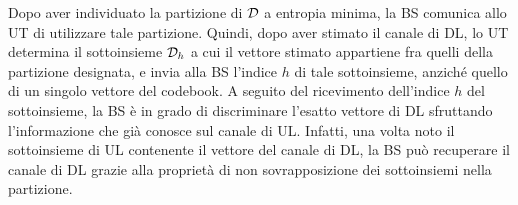 Dopo aver individuato la partizione di \(\mathcal{D}\) a entropia minima, la BS
comunica allo UT di utilizzare tale partizione. Quindi, dopo aver stimato il
canale di DL, lo UT determina il sottoinsieme \(\mathcal{D}_h\) a cui il vettore
stimato appartiene fra quelli della partizione designata, e invia alla BS
l'indice \(h\) di tale sottoinsieme, anziché quello di un singolo vettore del
codebook. A seguito del ricevimento dell'indice \(h\) del sottoinsieme, la BS è
in grado di discriminare l'esatto vettore di DL sfruttando l'informazione che
già conosce sul canale di UL. Infatti, una volta noto il sottoinsieme di UL
contenente il vettore del canale di DL, la BS può recuperare il canale di DL
grazie alla proprietà di non sovrapposizione dei sottoinsiemi nella partizione.


